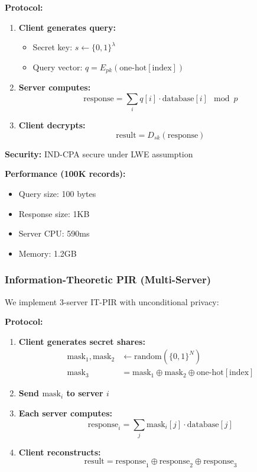 \documentclass[11pt,letterpaper]{article}
\begin{document}
\textbf{Protocol:}
\begin{enumerate}
\item \textbf{Client generates query:}
\begin{itemize}
\item Secret key: $s \leftarrow \{0,1\}^\lambda$
\item Query vector: $q = E_{pk}(\text{one-hot}[\text{index}])$
\end{itemize}

\item \textbf{Server computes:}
\begin{equation}
\text{response} = \sum_i q[i] \cdot \text{database}[i] \mod p
\end{equation}

\item \textbf{Client decrypts:}
\begin{equation}
\text{result} = D_{sk}(\text{response})
\end{equation}
\end{enumerate}

\textbf{Security:} IND-CPA secure under LWE assumption \cite{regev2009}

\textbf{Performance (100K records):}
\begin{itemize}
\item Query size: 100 bytes
\item Response size: 1KB
\item Server CPU: 590ms
\item Memory: 1.2GB
\end{itemize}

\subsubsection{Information-Theoretic PIR (Multi-Server)}

We implement 3-server IT-PIR with unconditional privacy:

\textbf{Protocol:}
\begin{enumerate}
\item \textbf{Client generates secret shares:}
\begin{align}
\text{mask}_1, \text{mask}_2 &\leftarrow \text{random}(\{0,1\}^N) \\
\text{mask}_3 &= \text{mask}_1 \oplus \text{mask}_2 \oplus \text{one-hot}[\text{index}]
\end{align}

\item \textbf{Send $\text{mask}_i$ to server $i$}

\item \textbf{Each server computes:}
\begin{equation}
\text{response}_i = \sum_j \text{mask}_i[j] \cdot \text{database}[j]
\end{equation}

\item \textbf{Client reconstructs:}
\begin{equation}
\text{result} = \text{response}_1 \oplus \text{response}_2 \oplus \text{response}_3
\end{equation}
\end{enumerate}
\end{document}
